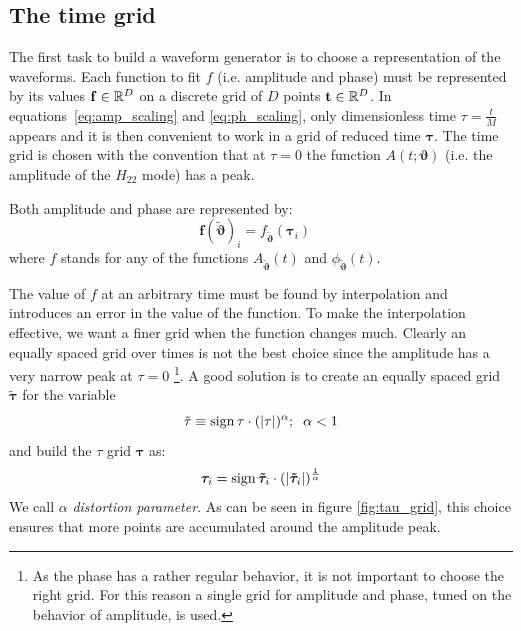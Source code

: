 \subsection{The time grid}
The first task to build a waveform generator is to choose a representation of the waveforms. Each function to fit $f$ (i.e. amplitude and phase) must be represented by its values $\mathbf{f} \in \mathbb{R}^D$ on a discrete grid of $D$ points $\mathbf{t} \in \mathbb{R}^D$.
In equations~\eqref{eq:amp_scaling} and \eqref{eq:ph_scaling}, only dimensionless time $\tau=\frac{t}{M}$ appears and it is then convenient to work in a grid of reduced time $\boldsymbol{\tau}$.
The time grid is chosen with the convention that at $\tau=0$ the function $A(t;\boldsymbol{\vartheta})$ (i.e. the amplitude of the $H_{22}$ mode) has a peak.
\par
Both amplitude and phase are represented by:
\begin{equation}
	\mathbf{f}({\tilde{\boldsymbol{\vartheta}}})_i = f_{{\tilde{\boldsymbol{\vartheta}}}}(\boldsymbol{\tau}_i) \;\;\; 
\end{equation}
where $f$ stands for any of the functions $A_{\tilde{\boldsymbol{\vartheta}}}(t)$ and ${\phi}_{\tilde{\boldsymbol{\vartheta}}}(t)$.
\par
The value of $f$ at an arbitrary time must be found by interpolation and introduces an error in the value of the function.
To make the interpolation effective, we want a finer grid when the function changes much.
Clearly an equally spaced grid over times is not the best choice since the amplitude has a very narrow peak at $\tau=0$
\footnote{As the phase has a rather regular behavior, it is not important to choose the right grid. For this reason a single grid for amplitude and phase, tuned on the behavior of amplitude, is used.}.
A good solution is to create an equally spaced grid $\boldsymbol{\tilde{\tau}}$ for the variable
\begin{equation} \label{eq:tau_tilde}
	{\tilde{\tau}} \equiv \operatorname{sign}{\tau} \cdot (|\tau|)^\alpha ;\;\; \alpha < 1
\end{equation}
and build the $\tau$ grid ${\boldsymbol{\tau}}$ as:
\begin{equation} \label{eq:tau_grid}
	{\boldsymbol{\tau}}_i = \operatorname{sign}{\boldsymbol{\tilde{\tau}}_i} \cdot (|\boldsymbol{\tilde{\tau}}_i|)^{\frac{1}{\alpha}}
\end{equation}
We call $\alpha$ \textit{distortion parameter}.
As can be seen in figure \ref{fig:tau_grid}, this choice ensures that more points are accumulated around the amplitude peak.
